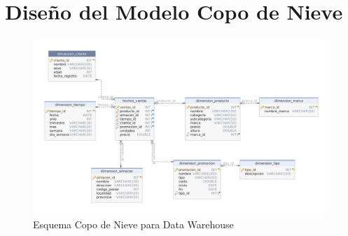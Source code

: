 \documentclass{article}
\begin{document}
\newpage
\section*{Diseño del Modelo Copo de Nieve}
\begin{figure}[ht]
    \centering
    \includegraphics[width=\textwidth]{snowflake-schema.png}
    \caption{Esquema Copo de Nieve para Data Warehouse}
\end{figure}
\end{document}

